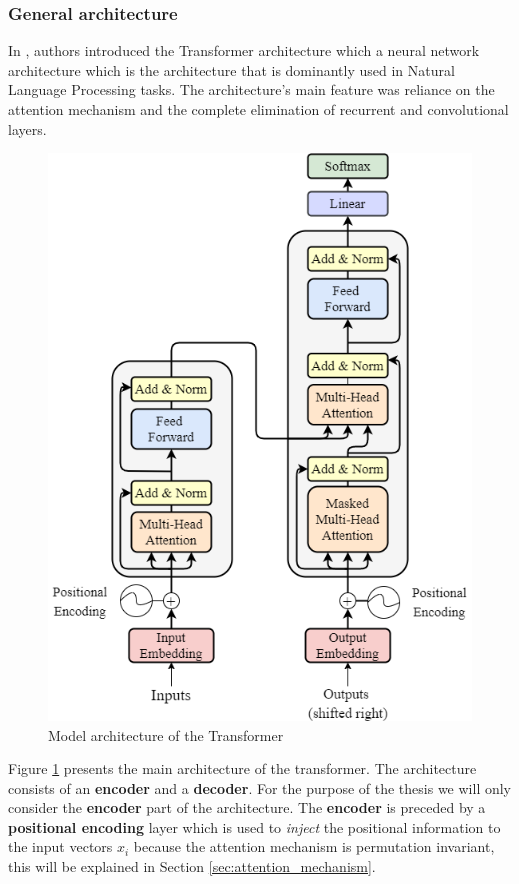 \documentclass[a4paper, twoside]{report}
\theoremstyle{definition}
\numberwithin{equation}{section}
\begin{document}
\subsubsection{General architecture}

In \cite{1706.03762}, authors introduced the Transformer architecture which a neural network architecture
which is the architecture that is dominantly used in Natural Language Processing tasks.
The architecture's main feature was reliance on the attention mechanism and the complete elimination
of recurrent and convolutional layers.

\begin{figure}[h!]
    \centering
    \includegraphics[scale=0.5]{attention_is_all_you_need.png}
    \caption{Model architecture of the Transformer \cite{1706.03762}}
    \label{fig:attention_is_all_you_need}
\end{figure}

Figure \ref{fig:attention_is_all_you_need} presents the main architecture of the transformer.
The architecture consists of an \textbf{encoder} and a \textbf{decoder}.
For the purpose of the thesis we will only consider the \textbf{encoder} part of the architecture.
The \textbf{encoder} is preceded by a \textbf{positional encoding} layer which is used to \emph{inject} the positional information
to the input vectors $x_i$ because the attention mechanism is permutation invariant, this will be explained in Section \ref{sec:attention_mechanism}.
\end{document}
